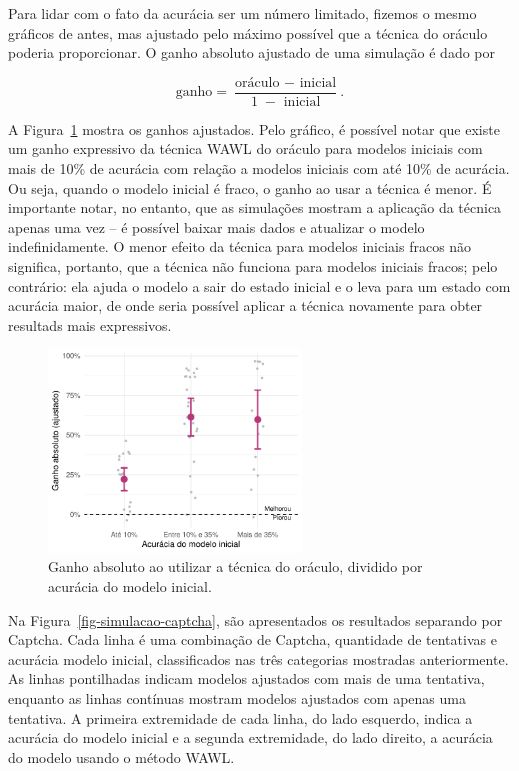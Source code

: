 \documentclass[12pt,twoside,brazilian]{book}
\begin{document}
Para lidar com o fato da acurácia ser um número limitado, fizemos o
mesmo gráficos de antes, mas ajustado pelo máximo possível que a técnica
do oráculo poderia proporcionar. O ganho absoluto ajustado de uma
simulação é dado por

\[
\text{ganho} = \frac{\text{oráculo } - \text{ inicial}}{1\; - \text{ inicial}}.
\]

A Figura~\ref{fig-simulacao-geral-inicial-absoluto-ajustado} mostra os
ganhos ajustados. Pelo gráfico, é possível notar que existe um ganho
expressivo da técnica WAWL do oráculo para modelos iniciais com mais de
10\% de acurácia com relação a modelos iniciais com até 10\% de
acurácia. Ou seja, quando o modelo inicial é fraco, o ganho ao usar a
técnica é menor. É importante notar, no entanto, que as simulações
mostram a aplicação da técnica apenas uma vez -- é possível baixar mais
dados e atualizar o modelo indefinidamente. O menor efeito da técnica
para modelos iniciais fracos não significa, portanto, que a técnica não
funciona para modelos iniciais fracos; pelo contrário: ela ajuda o
modelo a sair do estado inicial e o leva para um estado com acurácia
maior, de onde seria possível aplicar a técnica novamente para obter
resultads mais expressivos.

\begin{figure}

{\centering \includegraphics[width=0.6\textwidth,height=\textheight]{./resultados_files/figure-pdf/fig-simulacao-geral-inicial-absoluto-ajustado-1.pdf}

}

\caption{\label{fig-simulacao-geral-inicial-absoluto-ajustado}Ganho
absoluto ao utilizar a técnica do oráculo, dividido por acurácia do
modelo inicial.}

\end{figure}

Na Figura~\ref{fig-simulacao-captcha}, são apresentados os resultados
separando por Captcha. Cada linha é uma combinação de Captcha,
quantidade de tentativas e acurácia modelo inicial, classificados nas
três categorias mostradas anteriormente. As linhas pontilhadas indicam
modelos ajustados com mais de uma tentativa, enquanto as linhas
contínuas mostram modelos ajustados com apenas uma tentativa. A primeira
extremidade de cada linha, do lado esquerdo, indica a acurácia do modelo
inicial e a segunda extremidade, do lado direito, a acurácia do modelo
usando o método WAWL.
\end{document}
